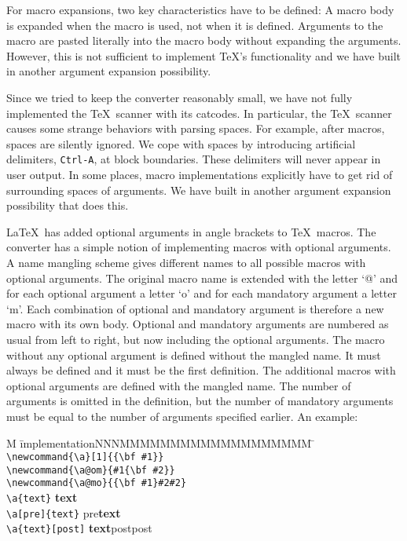\documentclass[12pt]{article}
\newcommand{\Dindex}[1]{#1\index{#1}}
\begin{document}
For macro expansions, two key characteristics have to be defined: A
macro body is expanded when the macro is used, not when it is defined.
Arguments to the macro are pasted literally into the macro body
without expanding the arguments. However, this is not sufficient to
implement \TeX's functionality and we have built in another argument
expansion possibility.

Since we tried to keep the converter reasonably small, we have not
fully implemented the \TeX\ scanner with its catcodes.
In particular, the \TeX\ scanner causes some strange behaviors with
\Dindex{parsing} spaces.
For example, after macros, spaces are silently ignored. We cope with
spaces by introducing artificial delimiters, {\tt Ctrl-A}, at block
boundaries. These delimiters will never appear in user output. In some
places, macro implementations explicitly have to get rid of
surrounding spaces of arguments. We have built in another argument
expansion possibility that does this.

\LaTeX\ has added optional arguments in angle brackets to \TeX\ 
macros. The converter has a simple notion of implementing macros with
optional arguments. A name mangling scheme gives different names to
all possible macros with optional arguments. The original macro name
is extended with the letter `@' and for each optional argument a
letter `o' and for each mandatory argument a letter `m'. Each
combination of optional and mandatory argument is therefore a new
macro with its own body. Optional and mandatory arguments are numbered
as usual from left to right, but now including the optional arguments.
The macro without any optional argument is defined without the mangled
name. It must always be defined and it must be the first definition.
The additional macros with optional arguments are defined with the
mangled name. The number of arguments is omitted in the definition,
but the number of mandatory arguments must be equal to the number of
arguments specified earlier. An example:
\index{arguments, macro}

\begin{tabbing}
  M \= implementationNNNMMMMMMMMMMMMMMMMMMM \= \kill
  \> \verb+\newcommand{\a}[1]{{\bf #1}}+ \\
  \> \verb+\newcommand{\a@om}{#1{\bf #2}}+ \\
  \> \verb+\newcommand{\a@mo}{{\bf #1}#2#2}+ \\
  \> \verb+\a{text}+         \> {\bf text}\\
  \> \verb+\a[pre]{text}+    \> pre{\bf text}\\
  \> \verb+\a{text}[post]+   \> {\bf text}postpost
\end{tabbing}
\end{document}
